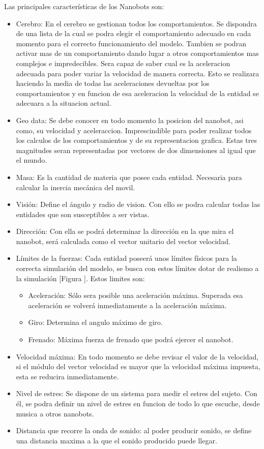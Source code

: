 \noindent Las principales características de los Nanobots son:  
\begin{itemize}
 \item  Cerebro: En el cerebro se gestionan todos los comportamientos. Se dispondra de una lista de la cual se podra elegir el comportamiento adecuado en cada momento para el correcto funcionamiento del modelo. Tambien se podran activar mas de un comportamiento dando lugar a otros comportamientos mas complejos e impredecibles. Sera capaz de saber cual es la aceleracion adecuada para poder variar la velocidad de manera correcta. Esto se realizara haciendo la media de todas las aceleraciones devueltas por los comportamientos y en funcion de esa aceleracion la velocidad de la entidad se adecuara a la situacion actual.
 \item Geo data: Se debe conocer en todo momento la posicion del nanobot, asi como, su velocidad y aceleraccion. Imprescindible para poder realizar todos los calculos de los comportamientos y de su representacion grafica. Estas tres magnitudes seran representadas por vectores de dos dimensiones al igual que el mundo.
 \item Masa: Es la cantidad de materia que posee cada entidad. Necesaria para calcular la inercia mecánica del movil. 
 \item Visión: Define el ángulo y radio de vision. Con ello se podra calcular todas las entidades que son susceptibles a ser vistas.
 \item Dirección: Con ella se podrá determinar la dirección en la que mira el nanobot, será calculada como el vector unitario del vector velocidad.
 \item Límites de la fuerzas: Cada entidad poseerá unos límites físicos para la correcta simulación del modelo, se busca con estos límites dotar de realismo a la simulación [Figura ]. Estos limites son:
 \begin{itemize}
   \item Aceleración: Sólo sera posible una aceleración máxima. Superada esa aceleración se volverá inmediatamente a la aceleración máxima.
   \item Giro: Determina el angulo máximo de giro.
   \item Frenado: Máxima fuerza de frenado que podrá ejercer el nanobot. 
 \end{itemize}	
 \item Velocidad máxima: En todo momento se debe revisar el valor de la velocidad, si el módulo del vector velocidad es mayor que la velocidad máxima impuesta, esta se reducira inmediatamente.
 \item Nivel de estres: Se dispone de un sistema para medir el estres del sujeto. Con él, se podra definir un nivel de estres en funcion de todo lo que escuche, desde musica a otros nanobots.
 \item Distancia que recorre la onda de sonido: al poder producir sonido, se define una distancia maxima a la que el sonido producido puede llegar.
\end{itemize}


